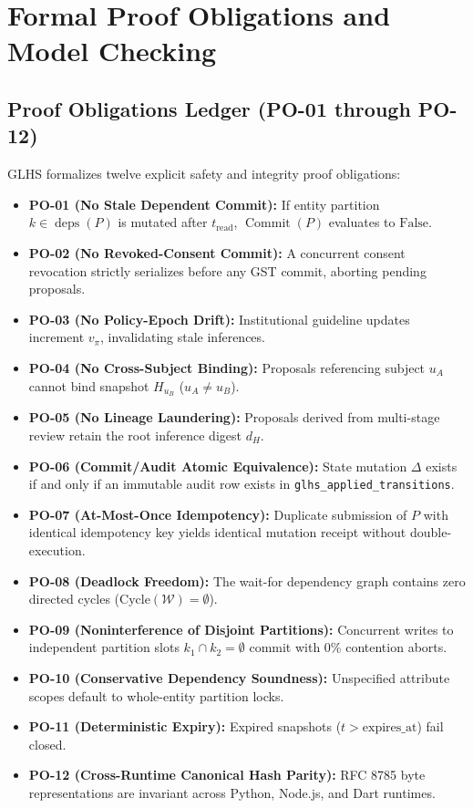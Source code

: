 \documentclass[11pt,a4paper]{article}
\begin{document}
\section{Formal Proof Obligations and Model Checking}

\subsection{Proof Obligations Ledger (PO-01 through PO-12)}
GLHS formalizes twelve explicit safety and integrity proof obligations:
\begin{itemize}[leftmargin=1.8em]
  \item \textbf{PO-01 (No Stale Dependent Commit):} If entity partition $k \in \operatorname{deps}(P)$ is mutated after $t_{\text{read}}$, $\operatorname{Commit}(P)$ evaluates to $\text{False}$.
  \item \textbf{PO-02 (No Revoked-Consent Commit):} A concurrent consent revocation strictly serializes before any GST commit, aborting pending proposals.
  \item \textbf{PO-03 (No Policy-Epoch Drift):} Institutional guideline updates increment $v_{\pi}$, invalidating stale inferences.
  \item \textbf{PO-04 (No Cross-Subject Binding):} Proposals referencing subject $u_A$ cannot bind snapshot $H_{u_B}$ ($u_A \neq u_B$).
  \item \textbf{PO-05 (No Lineage Laundering):} Proposals derived from multi-stage review retain the root inference digest $d_H$.
  \item \textbf{PO-06 (Commit/Audit Atomic Equivalence):} State mutation $\Delta$ exists if and only if an immutable audit row exists in \texttt{glhs\_applied\_transitions}.
  \item \textbf{PO-07 (At-Most-Once Idempotency):} Duplicate submission of $P$ with identical idempotency key yields identical mutation receipt without double-execution.
  \item \textbf{PO-08 (Deadlock Freedom):} The wait-for dependency graph contains zero directed cycles ($\text{Cycle}(\mathcal{W}) = \emptyset$).
  \item \textbf{PO-09 (Noninterference of Disjoint Partitions):} Concurrent writes to independent partition slots $k_1 \cap k_2 = \emptyset$ commit with 0\% contention aborts.
  \item \textbf{PO-10 (Conservative Dependency Soundness):} Unspecified attribute scopes default to whole-entity partition locks.
  \item \textbf{PO-11 (Deterministic Expiry):} Expired snapshots ($t > \text{expires\_at}$) fail closed.
  \item \textbf{PO-12 (Cross-Runtime Canonical Hash Parity):} RFC 8785 byte representations are invariant across Python, Node.js, and Dart runtimes.
\end{itemize}
\end{document}
